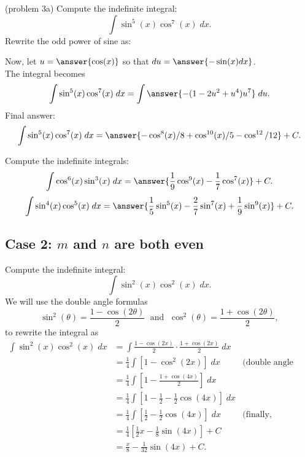 \documentclass{ximera}
\begin{document}
\begin{problem}(problem 3a)
Compute the indefinite integral:
\[
\int \sin^5(x)\cos^7(x) \; dx.
\]
Rewrite the odd power of sine as:
\begin{multipleChoice}

\end{multipleChoice}

Now, let $u = \answer{\cos(x)}$ so that $du = \answer{-\sin(x) dx}$.\\
The integral becomes
\[
\int \sin^5(x)\cos^7(x) \; dx= \int \answer{-(1-2u^2 + u^4)u^7} \; du.
\]
Final answer:
\[
\int \sin^5(x)\cos^7(x) \; dx= \answer{-\cos^8(x)/8 + \cos^{10}(x)/5 - \cos^{12}/12} + C.
\]
\end{problem}



\begin{problem}
Compute the indefinite integrals:
\[
\int \cos^6(x)\sin^3(x) \; dx = \answer{\frac19 \cos^9(x) - \frac17 \cos^7(x)} + C.
\]
\[
\int \sin^4(x)\cos^5(x) \; dx = \answer{\frac15 \sin^5(x) - \frac27 \sin^7(x)+\frac19 \sin^9(x)} + C.
\]
\end{problem}

\subsection{Case 2: $m$ and $n$ are both even}
\begin{example}
Compute the indefinite integral:
\[
\int \sin^2(x)\cos^2(x) \; dx.
\]
We will use the double angle formulas
\[
\sin^2(\theta) = \frac{1-\cos(2\theta)}{2} \; \text{ and } \; \cos^2(\theta) = \frac{1+\cos(2\theta)}{2},
\]
to rewrite the integral as
\begin{align*}
\int \sin^2(x)\cos^2(x) \; dx &= \int \frac{1-\cos(2x)}{2}\cdot \frac{1+\cos(2x)}{2} \; dx\\
  &= \frac14 \int \left[1 - \cos^2(2x)\right] \; dx &
  \text{(double angle formula again)}\\
  &= \frac14 \int \left[ 1- \frac{1+\cos(4x)}{2}\right] \; dx\\
  &= \frac14 \int \left[1-\frac12 - \frac12\cos(4x)\right] \; dx\\
  &= \frac14 \int \left[\frac12 - \frac12\cos(4x)\right] \; dx & \text{(finally, integrate)}\\
  &= \frac14 \left[\frac12 x  - \frac18\sin(4x)\right] + C\\
  &= \frac{x}{8}  - \frac{1}{32}\sin(4x) + C.
\end{align*}
\end{example}
\end{document}

